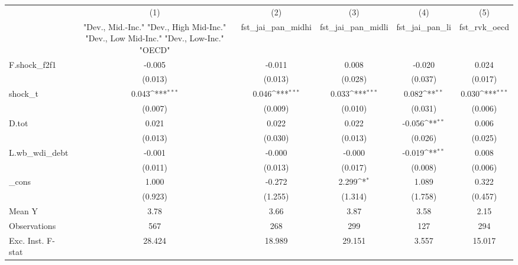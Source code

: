 {
\def\sym#1{\ifmmode^{#1}\else\(^{#1}\)\fi}
\begin{tabular}{l*{5}{c}}
\toprule
            &\multicolumn{1}{c}{(1)}&\multicolumn{1}{c}{(2)}&\multicolumn{1}{c}{(3)}&\multicolumn{1}{c}{(4)}&\multicolumn{1}{c}{(5)}\\
            &\multicolumn{1}{c}{ "Dev., Mid.-Inc." "Dev., High Mid-Inc." "Dev., Low Mid-Inc." "Dev., Low-Inc." "OECD" }&\multicolumn{1}{c}{fst\_jai\_pan\_midhi}&\multicolumn{1}{c}{fst\_jai\_pan\_midli}&\multicolumn{1}{c}{fst\_jai\_pan\_li}&\multicolumn{1}{c}{fst\_rvk\_oecd}\\
\midrule
F.shock\_f2f1&      -0.005         &      -0.011         &       0.008         &      -0.020         &       0.024         \\
            &     (0.013)         &     (0.013)         &     (0.028)         &     (0.037)         &     (0.017)         \\
\addlinespace
shock\_t     &       0.043\sym{***}&       0.046\sym{***}&       0.033\sym{***}&       0.082\sym{**} &       0.030\sym{***}\\
            &     (0.007)         &     (0.009)         &     (0.010)         &     (0.031)         &     (0.006)         \\
\addlinespace
D.tot       &       0.021         &       0.022         &       0.022         &      -0.056\sym{**} &       0.006         \\
            &     (0.013)         &     (0.030)         &     (0.013)         &     (0.026)         &     (0.025)         \\
\addlinespace
L.wb\_wdi\_debt&      -0.001         &      -0.000         &      -0.000         &      -0.019\sym{**} &       0.008         \\
            &     (0.011)         &     (0.013)         &     (0.017)         &     (0.008)         &     (0.006)         \\
\addlinespace
\_cons      &       1.000         &      -0.272         &       2.299\sym{*}  &       1.089         &       0.322         \\
            &     (0.923)         &     (1.255)         &     (1.314)         &     (1.758)         &     (0.457)         \\
\midrule
Mean Y      &        3.78         &        3.66         &        3.87         &        3.58         &        2.15         \\
Observations&         567         &         268         &         299         &         127         &         294         \\
Exc. Inst. F-stat&      28.424         &      18.989         &      29.151         &       3.557         &      15.017         \\
\bottomrule
\end{tabular}
}
